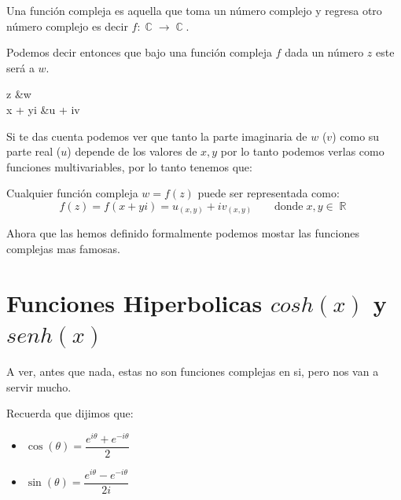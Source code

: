 \documentclass[12pt, fleqn]{report}                             %
\newcommand \Quote {\qq}                                        %
\DeclareMathOperator \Space {\quad}                             %
\newcommand{\Wrap}[1]{\left( #1 \right)}                        %
\newenvironment{MultiLineEquation*}[1]                          %
        {\begin{equation*}\begin{alignedat}{#1}}                    %
        {\end{alignedat}\end{equation*}}                            %
\newcommand \longto {\longrightarrow}                           %
\DeclareMathOperator \Reals     {\mathbb{R}}                     %
\DeclareMathOperator \Complexs  {\mathbb{C}}                     %
\newcommand{\Cos}[1]{\cos\Wrap{#1}}                             %
\newcommand{\Sin}[1]{\sin\Wrap{#1}}                             %
\begin{document}
            Una función compleja es aquella que toma un número complejo y regresa otro número complejo
            es decir $f : \Complexs \to \Complexs$.

            Podemos decir entonces que bajo una función compleja $f$ dada un número $z$
            este será \Quote{mapeado} a $w$.
            \begin{MultiLineEquation*}{3}
                z       &\Space\overset{\scriptsize{f(z)}}{\longto}\Space w           \\
                x + yi  &\Space\overset{\scriptsize{f(z)}}{\longto}\Space u + iv          
            \end{MultiLineEquation*}

            Si te das cuenta podemos ver que tanto la parte imaginaria de $w$ ($v$) como su parte
            real ($u$) depende de los valores de $x, y$ por lo tanto podemos verlas como funciones
            multivariables, por lo tanto tenemos que:
                

            Cualquier función compleja $w = f(z)$ puede ser representada como:
            \begin{equation}
               f(z) = f(x+yi) = u_{(x, y)} + iv_{(x, y)} \Space\text{ donde}\; x, y \in \Reals 
            \end{equation}


            Ahora que las hemos definido formalmente podemos mostar las funciones complejas
            mas famosas.





        \clearpage
        \section{Funciones Hiperbolicas $cosh(x)$ y $senh(x)$}

            A ver, antes que nada, estas no son funciones complejas en si, pero nos
            van a servir mucho.

            Recuerda que dijimos que:

            \begin{itemize}
                \item $\Cos{\theta} = \dfrac{ e^{i\theta} + e^{-i\theta} }{2}$
                \item $\Sin{\theta} = \dfrac{ e^{i\theta} - e^{-i\theta} }{2i}$
            \end{itemize}
\end{document}
